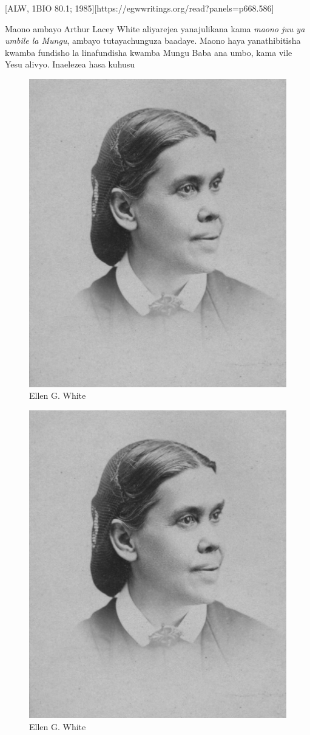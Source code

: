 [ALW, 1BIO 80.1; 1985][https://egwwritings.org/read?panels=p668.586]

Maono ambayo Arthur Lacey White aliyarejea yanajulikana kama \textit{maono juu ya umbile la Mungu}, ambayo tutayachunguza baadaye. Maono haya yanathibitisha kwamba fundisho la  linafundisha kwamba Mungu Baba ana umbo, kama vile Yesu alivyo. Inaelezea hasa kuhusu 

\begin{figure}[t]
    \centering
    \includegraphics[width=0.65\linewidth]{images/ellen-white.jpg}
    \caption*{Ellen G. White}
    \label{fig:ellen-g-white}
\end{figure}

\begin{figure}[t]
    \centering
    \includegraphics[width=0.65\linewidth]{images/ellen-white.jpg}
    \caption*{Ellen G. White}
    \label{fig:ellen-g-white}
\end{figure}

